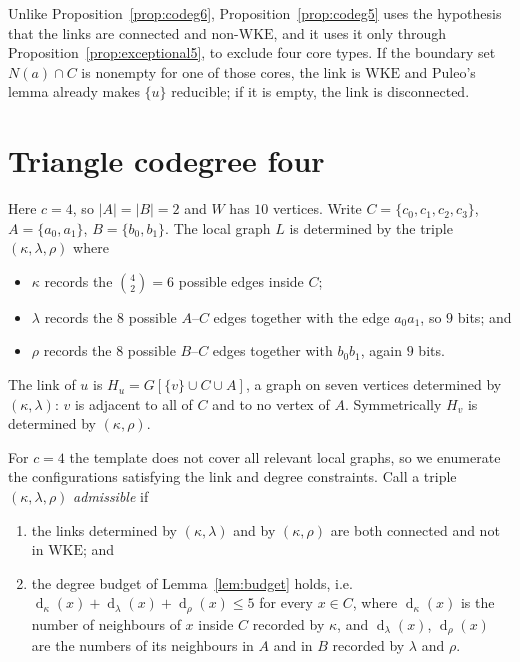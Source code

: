\documentclass[11pt,a4paper]{amsart}
\theoremstyle{plain}
\theoremstyle{definition}
\newcommand{\WKE}{\mathrm{WKE}}
\newcommand{\N}{N}
\newcommand{\dg}{\operatorname{d}}
\begin{document}
Unlike Proposition~\ref{prop:codeg6}, Proposition~\ref{prop:codeg5} uses the
hypothesis that the links are connected and non-$\WKE$, and it uses it only
through Proposition~\ref{prop:exceptional5}, to exclude four core types. If
the boundary set $\N(a)\cap C$ is nonempty for one of those cores, the link is
$\WKE$ and Puleo's lemma already makes $\{u\}$ reducible; if it is empty, the
link is disconnected.

\section{Triangle codegree four}\label{sec:codeg4}

Here $c=4$, so $|A|=|B|=2$ and $W$ has $10$ vertices. Write
$C=\{c_0,c_1,c_2,c_3\}$, $A=\{a_0,a_1\}$, $B=\{b_0,b_1\}$. The local graph
$L$ is determined by the triple $(\kappa,\lambda,\rho)$ where
\begin{itemize}
  \item $\kappa$ records the $\binom{4}{2}=6$ possible edges inside $C$;
  \item $\lambda$ records the $8$ possible $A$--$C$ edges together with the
    edge $a_0a_1$, so $9$ bits; and
  \item $\rho$ records the $8$ possible $B$--$C$ edges together with $b_0b_1$,
    again $9$ bits.
\end{itemize}
The link of $u$ is $H_u=G[\{v\}\cup C\cup A]$, a graph on seven vertices
determined by $(\kappa,\lambda)$: $v$ is adjacent to all of $C$ and to no
vertex of $A$. Symmetrically $H_v$ is determined by $(\kappa,\rho)$.

For $c=4$ the template does not cover all relevant local graphs, so we
enumerate the configurations satisfying the link and degree constraints.
Call a triple $(\kappa,\lambda,\rho)$ \emph{admissible} if

\begin{enumerate}
  \item[(A1)] the links determined by $(\kappa,\lambda)$ and by
    $(\kappa,\rho)$ are both connected and not in $\WKE$; and
  \item[(A2)] the degree budget of Lemma~\ref{lem:budget} holds, i.e.\
    $\dg_\kappa(x)+\dg_\lambda(x)+\dg_\rho(x)\le 5$ for every $x\in C$, where
    $\dg_\kappa(x)$ is the number of neighbours of $x$ inside $C$ recorded by
    $\kappa$, and $\dg_\lambda(x)$, $\dg_\rho(x)$ are the numbers of its
    neighbours in $A$ and in $B$ recorded by $\lambda$ and $\rho$.
\end{enumerate}
\end{document}

